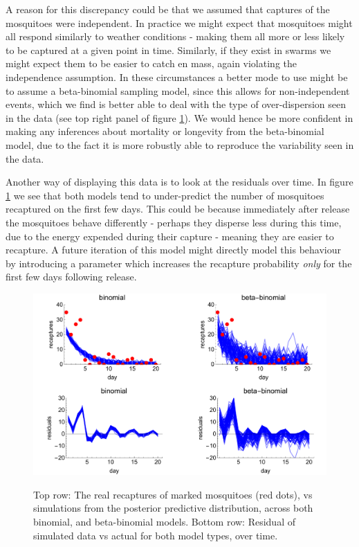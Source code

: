 \documentclass[11pt,fullpage]{book}
\begin{document}
A reason for this discrepancy could be that we assumed that captures of the mosquitoes were independent. In practice we might expect that mosquitoes might all respond similarly to weather conditions - making them all more or less likely to be captured at a given point in time. Similarly, if they exist in swarms we might expect them to be easier to catch en mass, again violating the independence assumption. In these circumstances a better mode to use might be to assume a beta-binomial sampling model, since this allows for non-independent events, which we find is better able to deal with the type of over-dispersion seen in the data (see top right panel of figure \ref{fig:Evaluation_mosquitoPPC}). We would hence be more confident in making any inferences about mortality or longevity from the beta-binomial model, due to the fact it is more robustly able to reproduce the variability seen in the data.

Another way of displaying this data is to look at the residuals over time. In figure \ref{fig:Evaluation_mosquitoPPC} we see that both models tend to under-predict the number of mosquitoes recaptured on the first few days. This could be because immediately after release the mosquitoes behave differently - perhaps they disperse less during this time, due to the energy expended during their capture - meaning they are easier to recapture. A future iteration of this model might directly model this behaviour by introducing a parameter which increases the recapture probability \textit{only} for the first few days following release.

\begin{figure}
\centering
\scalebox{0.5} 
{\includegraphics{Evaluation_mosquitoPPC.pdf}}
\caption{Top row: The real recaptures of marked mosquitoes (red dots), vs simulations from the posterior predictive distribution, across both binomial, and beta-binomial models. Bottom row: Residual of simulated data vs actual for both model types, over time.}\label{fig:Evaluation_mosquitoPPC}
\end{figure}
\end{document}
